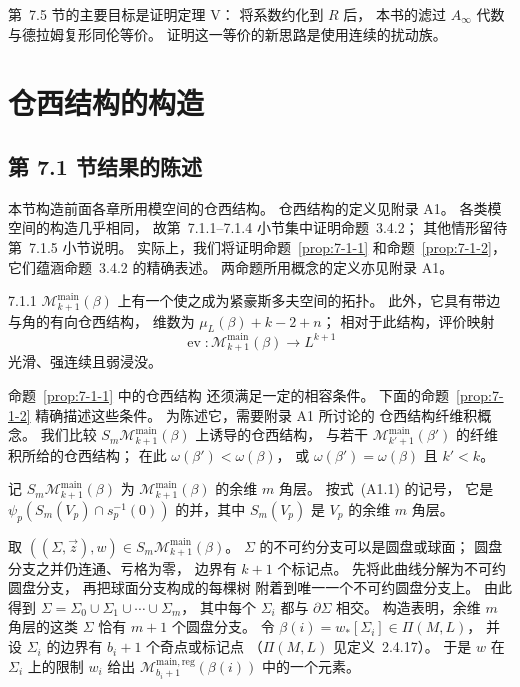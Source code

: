 第~7.5 节的主要目标是证明定理 V：
将系数约化到 $R$ 后，
本书的滤过 $A_\infty$ 代数与德拉姆复形同伦等价。
证明这一等价的新思路是使用连续的扰动族。

\section{仓西结构的构造}
\label{sec:7-1}

\subsection{第 7.1 节结果的陈述}
\label{subsec:7-1-1}

本节构造前面各章所用模空间的仓西结构。
仓西结构的定义见附录 A1。
各类模空间的构造几乎相同，
故第~7.1.1--7.1.4 小节集中证明命题~3.4.2；
其他情形留待第~7.1.5 小节说明。
实际上，我们将证明命题~\ref{prop:7-1-1}
和命题~\ref{prop:7-1-2}，
它们蕴涵命题~3.4.2 的精确表述。
两命题所用概念的定义亦见附录 A1。

\begin{proposition}{7.1.1}\label{prop:7-1-1}
$\mathcal M^{\mathrm{main}}_{k+1}(\beta)$
上有一个使之成为紧豪斯多夫空间的拓扑。
此外，它具有带边与角的有向仓西结构，
维数为 $\mu_L(\beta)+k-2+n$；
相对于此结构，评价映射
\[
\operatorname{ev}:
\mathcal M^{\mathrm{main}}_{k+1}(\beta)
\longrightarrow L^{k+1}
\]
光滑、强连续且弱浸没。
\end{proposition}

命题~\ref{prop:7-1-1} 中的仓西结构
还须满足一定的相容条件。
下面的命题~\ref{prop:7-1-2}
精确描述这些条件。
为陈述它，需要附录 A1 所讨论的
仓西结构纤维积概念。
我们比较 $S_m\mathcal M^{\mathrm{main}}_{k+1}(\beta)$
上诱导的仓西结构，
与若干 $\mathcal M^{\mathrm{main}}_{k'+1}(\beta')$
的纤维积所给的仓西结构；
在此 $\omega(\beta')<\omega(\beta)$，
或 $\omega(\beta')=\omega(\beta)$ 且 $k'<k$。

记 $S_m\mathcal M^{\mathrm{main}}_{k+1}(\beta)$
为 $\mathcal M^{\mathrm{main}}_{k+1}(\beta)$
的余维 $m$ 角层。
按式~(A1.1) 的记号，
它是
$\psi_p(S_m(V_p)\cap s_p^{-1}(0))$
的并，其中 $S_m(V_p)$ 是 $V_p$ 的余维 $m$ 角层。

取
$((\Sigma,\vec z),w)
\in S_m\mathcal M^{\mathrm{main}}_{k+1}(\beta)$。
$\Sigma$ 的不可约分支可以是圆盘或球面；
圆盘分支之并仍连通、亏格为零，
边界有 $k+1$ 个标记点。
先将此曲线分解为不可约圆盘分支，
再把球面分支构成的每棵树
附着到唯一一个不可约圆盘分支上。
由此得到
$\Sigma=\Sigma_0\cup\Sigma_1\cup\cdots\cup\Sigma_m$，
其中每个 $\Sigma_i$ 都与 $\partial\Sigma$ 相交。
构造表明，余维 $m$ 角层的这类 $\Sigma$
恰有 $m+1$ 个圆盘分支。
令
$\beta(i)=w_*[\Sigma_i]\in\Pi(M,L)$，
并设 $\Sigma_i$ 的边界有 $b_i+1$ 个奇点或标记点
（$\Pi(M,L)$ 见定义~2.4.17）。
于是 $w$ 在 $\Sigma_i$ 上的限制 $w_i$
给出
$\mathcal M^{\mathrm{main,reg}}_{b_i+1}(\beta(i))$
中的一个元素。

